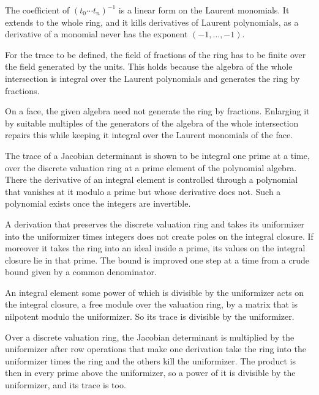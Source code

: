 The coefficient of $(t_0\cdots t_n)^{-1}$ is a linear form on the Laurent monomials. It extends to the whole ring, and it
kills derivatives of Laurent polynomials, as a derivative of a monomial never has the exponent $(-1,\ldots,-1)$.

For the trace to be defined, the field of fractions of the ring has to be finite over the field generated by the units.
This holds because the algebra of the whole intersection is integral over the Laurent polynomials and generates the
ring by fractions.

On a face, the given algebra need not generate the ring by fractions. Enlarging it by suitable multiples of the
generators of the algebra of the whole intersection repairs this while keeping it integral over the Laurent monomials of
the face.

The trace of a Jacobian determinant is shown to be integral one prime at a time, over the discrete valuation ring at a
prime element of the polynomial algebra. There the derivative of an integral element is controlled through a polynomial
that vanishes at it modulo a prime but whose derivative does not. Such a polynomial exists once the integers are
invertible.

A derivation that preserves the discrete valuation ring and takes its uniformizer into the uniformizer times integers
does not create poles on the integral closure. If moreover it takes the ring into an ideal inside a prime, its values on
the integral closure lie in that prime. The bound is improved one step at a time from a crude bound given by a common
denominator.

An integral element some power of which is divisible by the uniformizer acts on the integral closure, a free module over
the valuation ring, by a matrix that is nilpotent modulo the uniformizer. So its trace is divisible by the uniformizer.

Over a discrete valuation ring, the Jacobian determinant is multiplied by the uniformizer after row operations that make
one derivation take the ring into the uniformizer times the ring and the others kill the uniformizer. The product is then
in every prime above the uniformizer, so a power of it is divisible by the uniformizer, and its trace is too.

